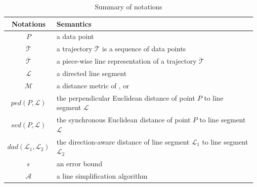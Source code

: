 	\begin{table}
	\renewcommand{\arraystretch}{1.20}
	\vspace{-1ex}
	\caption{\small Summary of notations}
	\centering
	\footnotesize
	\begin{tabular}{|c|l|}
		\hline
		{\bf Notations}& {\bf Semantics}   \\		\hline %
		$P$ & a data point \\		\hline
		$\dddot{\mathcal{T}}$ & a trajectory $\dddot{\mathcal{T}}$ is a sequence of data points\\		\hline
		$\overline{\mathcal{T}}$&  {a piece-wise line representation of a trajectory $\dddot{\mathcal{T}}$}	\\		\hline
		$\mathcal{L}$ & a directed line segment  \\		\hline
		$\mathcal{M}$ & a distance metric of \ped, \sed or \dad \\		\hline
		$ped\left(P, \mathcal{L}\right)$ &  {the perpendicular Euclidean distance of point $P$ to line segment $\mathcal{L}$}	\\	\hline
		$sed\left(P, \mathcal{L}\right)$ & {the synchronous Euclidean distance of point $P$ to line segment $\mathcal{L}$} 	\\		\hline
		$dad\left(\mathcal{L}_1, \mathcal{L}_2\right)$ & {the direction-aware distance of line segment $\mathcal{L}_1$ to line segment $\mathcal{L}_2$} 	\\		\hline
		$\epsilon$ & an error bound \\		\hline
		$\mathcal{A}$ & a line simplification algorithm \\		\hline
	\end{tabular}
	\label{tab:notations}
	\vspace{-1ex}
\end{table}


